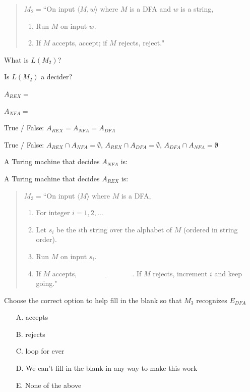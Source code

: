 \documentclass[12pt, oneside]{article}
\begin{document}
  
  \begin{quote}
  $M_2 =  $``On  input  $\langle M, w \rangle$ where $M$ is a  DFA and  $w$ is  a string, 
  \begin{enumerate}
  \item Run $M$ on  input  $w$.
  \item If $M$  accepts, accept; if $M$ rejects, reject."
  \end{enumerate}
  \end{quote}
  

  What is $L(M_2)$? 

  \vfill
  
  Is $L(M_2)$ a decider?
  
  \vfill
  
    
\newpage
  $A_{REX} = $

  $A_{NFA} = $


  True / False: $A_{REX} = A_{NFA} = A_{DFA}$

  True / False: $A_{REX} \cap A_{NFA} = \emptyset$, $A_{REX} \cap A_{DFA} = \emptyset$, $A_{DFA} \cap A_{NFA} = \emptyset$

  
  A Turing machine that  decides $A_{NFA}$ is: 
  
  \vfill
  
  A Turing machine that  decides $A_{REX}$ is: 
  
  \vfill
  \newpage
  
  \begin{quote}
  $M_3 =  $``On  input  $\langle M\rangle$ where $M$ is a  DFA,
  \begin{enumerate}
  \item For integer  $i = 1, 2, \ldots$
  \item \qquad Let  $s_i$ be the  $i$th string over  the alphabet of  $M$ (ordered in  string order).
  \item \qquad Run $M$ on  input  $s_i$.
  \item \qquad If $M$  accepts,  $\underline{\phantom{FILL  IN BLANK}}$.  If $M$  rejects, increment $i$ and keep going."
  \end{enumerate}
  \end{quote}
  

Choose the correct option to help fill in the blank so that $M_3$ recognizes $E_{DFA}$
\begin{itemize}
\item[A.] accepts
\item[B.] rejects
\item[C.] loop for ever
\item[D.] We can't fill in the blank in any way to make this work
\item[E.] None of the above
\end{itemize}
\end{document}
